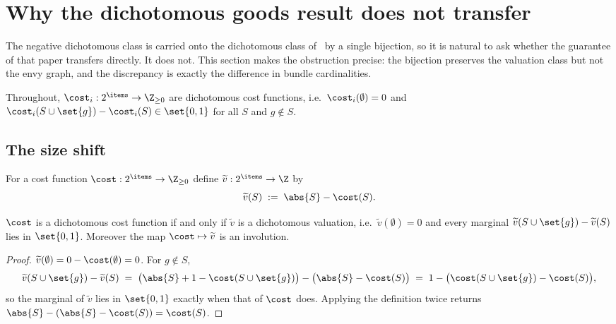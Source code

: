 
\section{Why the dichotomous goods result does not transfer}
\label{sec:sizeshift}

The negative dichotomous class is carried onto the dichotomous class
of~\cite{BKNS22} by a single bijection, so it is natural to ask whether the
guarantee of that paper transfers directly. It does not. This section makes the
obstruction precise: the bijection preserves the valuation class but not the
envy graph, and the discrepancy is exactly the difference in bundle
cardinalities.

Throughout, $\cost_i : 2^{\items} \to \Z_{\ge 0}$ are dichotomous cost
functions, i.e.\ $\cost_i(\emptyset) = 0$ and
$\cost_i(S \cup \set{g}) - \cost_i(S) \in \set{0,1}$ for all $S$ and
$g \notin S$.

\subsection{The size shift}

\begin{definition}
\label{def:sizeshift}
For a cost function $\cost : 2^{\items} \to \Z_{\ge 0}$ define
$\widetilde{v} : 2^{\items} \to \Z$ by
\[
  \widetilde{v}(S) \;:=\; \abs{S} - \cost(S).
\]
\end{definition}

\begin{lemma}
\label{lem:ss-bijection}
$\cost$ is a dichotomous cost function if and only if $\widetilde{v}$ is a
dichotomous valuation, i.e.\ $\widetilde{v}(\emptyset) = 0$ and every marginal
$\widetilde{v}(S \cup \set{g}) - \widetilde{v}(S)$ lies in $\set{0,1}$.
Moreover the map $\cost \mapsto \widetilde{v}$ is an involution.
\end{lemma}

\begin{proof}
$\widetilde{v}(\emptyset) = 0 - \cost(\emptyset) = 0$. For $g \notin S$,
\[
  \widetilde{v}(S \cup \set{g}) - \widetilde{v}(S)
  \;=\; \bigl(\abs{S}+1-\cost(S \cup \set{g})\bigr) - \bigl(\abs{S}-\cost(S)\bigr)
  \;=\; 1 - \bigl(\cost(S \cup \set{g}) - \cost(S)\bigr),
\]
so the marginal of $\widetilde{v}$ lies in $\set{0,1}$ exactly when that of
$\cost$ does. Applying the definition twice returns
$\abs{S} - (\abs{S} - \cost(S)) = \cost(S)$.
\end{proof}

